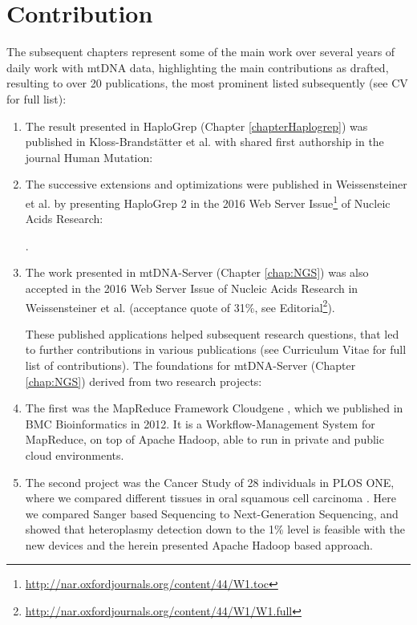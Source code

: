 \section{Contribution}


The subsequent chapters represent some of the main work over several years of daily work with mtDNA data, highlighting the main contributions as drafted, resulting to over 20 publications, the most prominent listed subsequently (see CV for full list):

\begin{enumerate}
\item 
The result presented in HaploGrep (Chapter \ref{chapterHaplogrep}) was published in Kloss-Brandst\"atter et al. with shared first authorship in the journal Human Mutation:

\item 
The successive extensions and optimizations were published in Weissensteiner et al. by presenting HaploGrep 2 in the 2016 Web Server Issue\footnote{\url{http://nar.oxfordjournals.org/content/44/W1.toc}} of Nucleic Acids Research:

.
\item 
The work presented in mtDNA-Server (Chapter \ref{chap:NGS}) was also accepted in the 2016 Web Server Issue of Nucleic Acids Research in Weissensteiner et al. (acceptance quote of 31\%, see Editorial\footnote{\url{http://nar.oxfordjournals.org/content/44/W1/W1.full}}).


These published applications helped subsequent research questions, that led to further contributions in various publications (see Curriculum Vitae for full list of contributions). 
The foundations for mtDNA-Server (Chapter \ref{chap:NGS}) derived from two research projects: 
\item The first was the MapReduce Framework Cloudgene \cite{Schonherr2012}, which we published in BMC Bioinformatics in 2012. It is a Workflow-Management System for MapReduce, on top of Apache Hadoop, able to run in private and public cloud environments.
\item The second project was the Cancer Study of 28 individuals in PLOS ONE, where we compared different tissues in oral squamous cell carcinoma \cite{Kloss-Brandstatter2015}. Here we compared Sanger based Sequencing to Next-Generation Sequencing, and showed that heteroplasmy detection down to the 1\% level is feasible with the new devices and the herein presented Apache Hadoop based approach. 


\end{enumerate}
